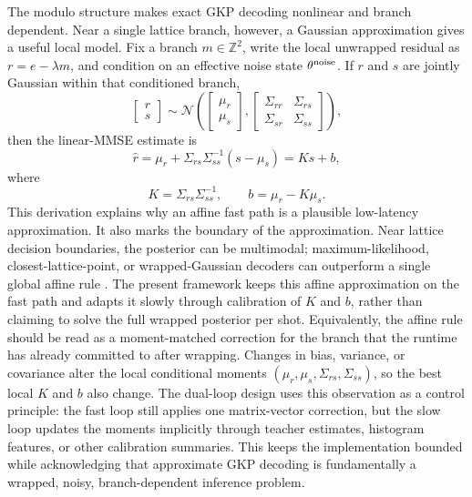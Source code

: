 \documentclass[11pt]{article}
\begin{document}
The modulo structure makes exact GKP decoding nonlinear and branch dependent.
Near a single lattice branch, however, a Gaussian approximation gives a useful
local model.  Fix a branch \(m\in\mathbb{Z}^2\), write the local unwrapped
residual as \(r=e-\lambda m\), and condition on an effective noise state
\(\theta^{\rm noise}\).  If \(r\) and \(s\) are jointly Gaussian within that
conditioned branch,
\begin{equation}
\begin{bmatrix}r\\s\end{bmatrix}
\sim
\mathcal{N}
\left(
\begin{bmatrix}\mu_r\\\mu_s\end{bmatrix},
\begin{bmatrix}
\Sigma_{rr} & \Sigma_{rs}\\
\Sigma_{sr} & \Sigma_{ss}
\end{bmatrix}
\right),
\end{equation}
then the linear-MMSE estimate is
\begin{equation}
    \hat r=\mu_r+\Sigma_{rs}\Sigma_{ss}^{-1}(s-\mu_s)=Ks+b,
\end{equation}
where
\begin{equation}
    K=\Sigma_{rs}\Sigma_{ss}^{-1},
    \qquad
    b=\mu_r-K\mu_s.
\end{equation}
This derivation explains why an affine fast path is a plausible low-latency
approximation.  It also marks the boundary of the approximation.  Near lattice
decision boundaries, the posterior can be multimodal; maximum-likelihood,
closest-lattice-point, or wrapped-Gaussian decoders can outperform a single
global affine rule \cite{fukui2018,roy2025}.  The present framework keeps this
affine approximation on the fast path and adapts it slowly through calibration
of \(K\) and \(b\), rather than claiming to solve the full wrapped posterior
per shot.
Equivalently, the affine rule should be read as a moment-matched correction for
the branch that the runtime has already committed to after wrapping.  Changes
in bias, variance, or covariance alter the local conditional moments
\((\mu_r,\mu_s,\Sigma_{rs},\Sigma_{ss})\), so the best local \(K\) and \(b\)
also change.  The dual-loop design uses this observation as a control
principle: the fast loop still applies one matrix-vector correction, but the
slow loop updates the moments implicitly through teacher estimates, histogram
features, or other calibration summaries.  This keeps the implementation
bounded while acknowledging that approximate GKP decoding is fundamentally a
wrapped, noisy, branch-dependent inference problem.
\end{document}
